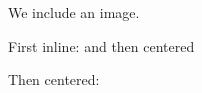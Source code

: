 \documentclass[minimal]{omdoc}
\begin{document}
We  include an image.

First inline:  and then centered

Then centered: 
\end{document}

